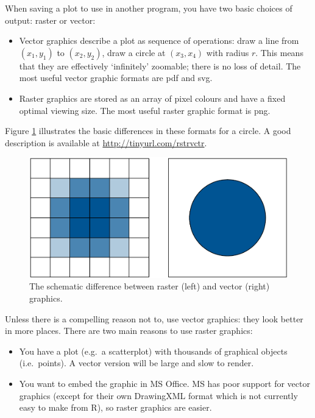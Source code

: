 
When saving a plot to use in another program, you have two basic choices
of output: raster or vector:  

\begin{itemize}
\item
  Vector graphics describe a plot as sequence of operations: draw a line
  from \((x_1, y_1)\) to \((x_2, y_2)\), draw a circle at \((x_3, x_4)\)
  with radius \(r\). This means that they are effectively `infinitely'
  zoomable; there is no loss of detail. The most useful vector graphic
  formats are pdf and svg.
\item
  Raster graphics are stored as an array of pixel colours and have a
  fixed optimal viewing size. The most useful raster graphic format is
  png.
\end{itemize}

Figure \ref{fig:vector-raster} illustrates the basic differences in
these formats for a circle. A good description is available at
\url{http://tinyurl.com/rstrvctr}.

\begin{figure}[htbp]
  \centering
    \includegraphics[width= 0.5\linewidth]{diagrams/vector-raster}
  \caption{The schematic difference between raster (left) and vector (right) graphics. }
  \label{fig:vector-raster}
\end{figure}

Unless there is a compelling reason not to, use vector graphics: they
look better in more places. There are two main reasons to use raster
graphics:

\begin{itemize}
\item
  You have a plot (e.g.~a scatterplot) with thousands of graphical
  objects (i.e.~points). A vector version will be large and slow to
  render.
\item
  You want to embed the graphic in MS Office. MS has poor support for
  vector graphics (except for their own DrawingXML format which is not
  currently easy to make from R), so raster graphics are easier.
\end{itemize}

